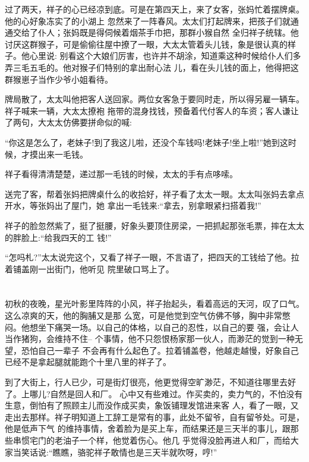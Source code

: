 \documentclass[11pt,a4paper,onecolumn]{article}
\begin{document}
过了两天，祥子的心已经凉到底。可是在第四天上，来了女客，张妈忙着摆牌桌。他的心好象冻实了的小湖上
忽然来了一阵春风。太太们打起牌来，把孩子们就通通交给了仆人；张妈既是得伺候着烟茶手巾把，那群小猴自然
全归祥子统辖。他讨厌这群猴子，可是偷偷往屋中撩了一眼，大太太管着头儿钱，象是很认真的样子。他心里说:
别看这个大娘们厉害，也许并不胡涂，知道乘这种时候给仆人们多弄三毛五毛的。他对猴子们特别的拿出耐心法
儿，看在头儿钱的面上，他得把这群猴崽子当作少爷小姐看待。

牌局散了，太太叫他把客人送回家。两位女客急于要同时走，所以得另雇一辆车。祥子喊来一辆，大太太撩袍
拖带的混身找钱，预备着代付客人的车资；客人谦让了两句，大太太仿佛要拼命似的喊:

``你这是怎么了，老妹子!到了我这儿啦，还没个车钱吗!老妹子!坐上啦!''她到这时候，才摸出来一毛钱。

祥子看得清清楚楚，递过那一毛钱的时候，太太的手有点哆嗦。

送完了客，帮着张妈把牌桌什么的收拾好，祥子看了太太一眼。太太叫张妈去拿点开水，等张妈出了屋门，她
拿出一毛钱来:``拿去，别拿眼紧扫搭着我!''

祥子的脸忽然紫了，挺了挺腰，好象头要顶住房梁，一把抓起那张毛票，摔在太太的胖脸上:``给我四天的工
钱!''

``怎吗札?''太太说完这个，又看了祥子一眼，不言语了，把四天的工钱给了他。拉着铺盖刚一出街门，他听见
院里破口骂上了。


\pagebreak
\section{}

初秋的夜晚，星光叶影里阵阵的小风，祥子抬起头，看着高远的天河，叹了口气。这么凉爽的天，他的胸脯又是那
么宽，可是他觉到空气仿佛不够，胸中非常憋闷。他想坐下痛哭一场。以自己的体格，以自己的忍性，以自己的要
强，会让人当作猪狗，会维持不住-- 个事情，他不只怨恨杨家那一伙人，而渺茫的觉到一种无望，恐怕自己一辈子
不会再有什么起色了。拉着铺盖卷，他越走越慢，好象自己已经不是拿起腿就能跑个十里八里的祥子了。

到了大街上，行人已少，可是街灯很亮，他更觉得空旷渺茫，不知道往哪里去好了。上哪儿?自然是回人和厂。
心中又有些难过。作买卖的，卖力气的，不怕没有生意，倒怕有了照顾主儿而没作成买卖，象饭铺理发馆进来客
人，看了一眼，又走出去那样。祥子明知道上工辞工是常有的事，此处不留爷，自有留爷处。可是，他是低声下气
的维持事情，舍着脸为是买上车，而结果还是三天半的事儿，跟那些串惯宅门的老油子一个样，他觉着伤心。他几
乎觉得没脸再进人和厂，而给大家当笑话说:``瞧瞧，骆驼祥子敢情也是三天半就吹呀，哼!''
\end{document}
